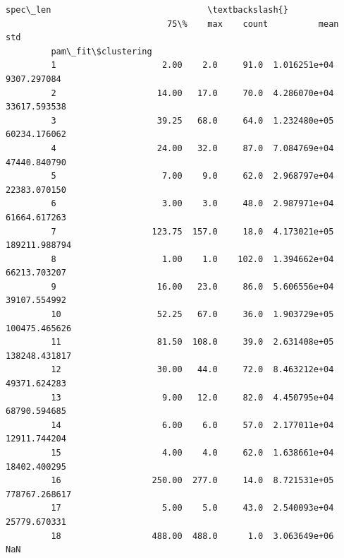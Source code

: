 \documentclass[11pt]{article}
\begin{document}
\begin{Verbatim}[commandchars=\\\{\}]
                                           spec\_len                               \textbackslash{}
                                75\%    max    count          mean            std   
         pam\_fit\$clustering                                                        
         1                     2.00    2.0     91.0  1.016251e+04    9307.297084   
         2                    14.00   17.0     70.0  4.286070e+04   33617.593538   
         3                    39.25   68.0     64.0  1.232480e+05   60234.176062   
         4                    24.00   32.0     87.0  7.084769e+04   47440.840790   
         5                     7.00    9.0     62.0  2.968797e+04   22383.070150   
         6                     3.00    3.0     48.0  2.987971e+04   61664.617263   
         7                   123.75  157.0     18.0  4.173021e+05  189211.988794   
         8                     1.00    1.0    102.0  1.394662e+04   66213.703207   
         9                    16.00   23.0     86.0  5.606556e+04   39107.554992   
         10                   52.25   67.0     36.0  1.903729e+05  100475.465626   
         11                   81.50  108.0     39.0  2.631408e+05  138248.431817   
         12                   30.00   44.0     72.0  8.463212e+04   49371.624283   
         13                    9.00   12.0     82.0  4.450795e+04   68790.594685   
         14                    6.00    6.0     57.0  2.177011e+04   12911.744204   
         15                    4.00    4.0     62.0  1.638661e+04   18402.400295   
         16                  250.00  277.0     14.0  8.721531e+05  778767.268617   
         17                    5.00    5.0     43.0  2.540093e+04   25779.670331   
         18                  488.00  488.0      1.0  3.063649e+06            NaN   
         

\end{Verbatim}
\end{document}
